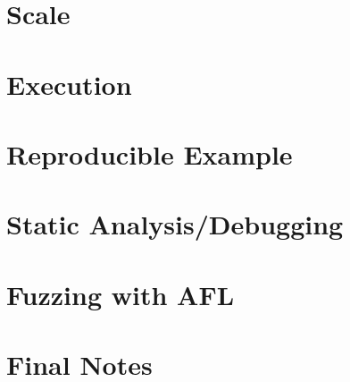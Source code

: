 \documentclass[12pt, letterpaper]{article}
\begin{document}
\begin{sloppypar}
\begin{flushleft}

\section*{Scale}


\section*{Execution}


\section*{Reproducible Example}


\section*{Static Analysis/Debugging}


\section*{Fuzzing with AFL}


\section*{Final Notes}

\end{flushleft}
\end{sloppypar}
\end{document}
